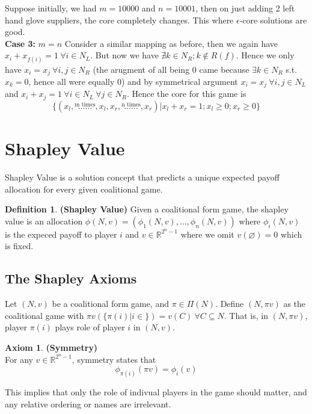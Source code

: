 \documentclass{article}
\theoremstyle{definition}
\newtheorem{defn}{Definition}[section]
\newtheorem{ax}{Axiom}[section]
\begin{document}
Suppose initially, we had $m=10000$ and $n=10001$, then on just adding 2 left hand glove suppliers, the core completely changes. This where $\epsilon$-core solutions are good.\\
\textbf{Case 3:} $m=n$ Consider a similar mapping as before, then we again have $x_i + x_{f(i)} = 1~\forall i \in N_L$. But now we have $\nexists k\in N_R;k \notin R(f)$. Hence we only have $x_i = x_j~\forall i,j \in N_R$ (the arugment of all being $0$ came because $\exists k \in N_R$ s.t. $x_k = 0$, hence all were equally 0) and by symmetrical argument $x_i = x_j~\forall i,j \in N_L$ and $x_i + x_j = 1 ~\forall i \in N_L~\forall j \in N_R$. Hence the core for this game is $$\{(x_l,\overset{\text{m times}}{\dots\dots},x_l,x_r,\overset{\text{n times}}{\dots\dots},x_r)| x_l + x_r = 1;x_l\geq 0;x_r\geq 0 \}$$
\section{Shapley Value}
Shapley Value is a solution concept that predicts a unique expected payoff allocation for every given coalitional game.
\begin{defn}
\textbf{(Shapley Value)} Given a coalitional form game, the shapley value is an allocation $\phi(N,v) = (\phi_1(N,v),\dots,\phi_n(N,v))$ where $\phi_i(N,v)$ is the expeced payoff to player $i$ and $v\in \mathbb{R}^{2^n - 1}$ where we omit $v(\varnothing) = 0$ which is fixed.
\end{defn}
\subsection{The Shapley Axioms}
Let $(N,v)$ be a coalitional form game, and $\pi \in \Pi(N)$. Define $(N,\pi v)$ as the coalitional game with $\pi v(\{ \pi(i)| i \in \}) = v(C)~\forall C\subseteq N$. That is, in $(N,\pi v)$, player $\pi(i)$ plays role of player $i$ in $(N,v)$.

\begin{ax}
\textbf{(Symmetry)}\\
For any $v \in \mathbb{R}^{2^n - 1}$, symmetry states that $$\phi_{\pi(i)} (\pi v) = \phi_i(v)$$
\end{ax}
This implies that only the role of indivual players in the game should matter, and any relative ordering or names are irrelevant.\\
\end{document}
